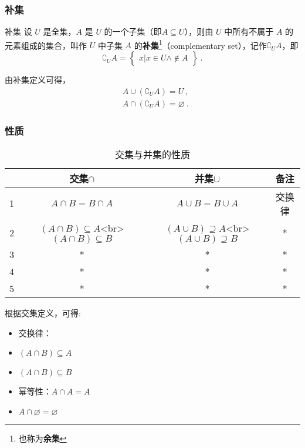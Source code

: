 \subsubsection{补集}
\begin{definition}{补集}
设 $U$ 是全集，$A$ 是 $U$ 的一个子集（即$A\subseteq U$），则由 $U$ 中所有不属于 $A$ 的元素组成的集合，叫作 $U$ 中子集 $A$ 的\textbf{补集}\footnote{也称为\textbf{余集}}（complementary set），记作$\complement_UA$，即
\begin{equation}
\complement_UA = \begin{Bmatrix}x|x\in U \wedge \notin A\end{Bmatrix}~.
\end{equation}
\end{definition}

由补集定义可得，
\begin{equation}
\begin{aligned}
&A\cup (\complement_UA) = U~, \\
&A\cap (\complement_UA) = \varnothing~.
\end{aligned}
\end{equation}

\subsubsection{性质}

\begin{table}[ht]
\centering
\caption{交集与并集的性质}\label{tab_HsSeOp1}
\begin{tabular}{|c|c|c|c|}
\hline
 & 交集$\cap$ & 并集$\cup$ & 备注 \\
\hline
1 & $A\cap B = B\cap A$ & $A\cup B = B\cup A$ & 交换律 \\
\hline
2 & $(A\cap B) \subseteq A$<br> $(A\cap B) \subseteq B$& $(A\cup B) \supseteq A$<br>$(A\cup B) \supseteq B$ & * \\
\hline
3 & * & * & * \\
\hline
4 & * & * & * \\
\hline
5 & * & * & * \\
\hline
\end{tabular}
\end{table}

根据交集定义，可得:
\begin{itemize}
\item 交换律：
\item $(A\cap B) \subseteq A$
\item $(A\cap B) \subseteq B$
\item 幂等性：$A\cap A = A$
\item $A\cap \varnothing = \varnothing$
\end{itemize}

